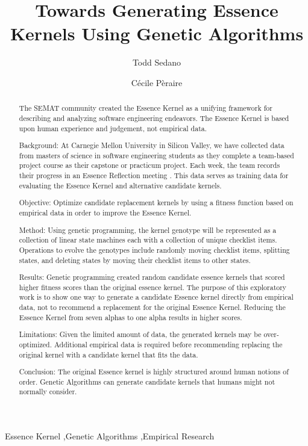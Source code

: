 \documentclass[preprint,12pt,3p]{elsarticle}
\begin{document}
\begin{frontmatter}

\title{Towards Generating Essence Kernels Using Genetic Algorithms}

\author{Todd Sedano}
\author{C\'ecile P\`eraire}
\address{Carnegie Mellon University}
\address{Silicon Valley Campus}
\address{Moffett Field, CA 94035, USA}



\begin{abstract}
The SEMAT community created the Essence Kernel as a unifying framework for describing and analyzing software engineering endeavors. \cite{JacobsonQueue} The Essence Kernel is based upon human experience and judgement, not empirical data. 

Background: At Carnegie Mellon University in Silicon Valley, we have collected data from masters of science in software engineering students as they complete a team-based project course as their capstone or practicum project. Each week, the team records their progress in an Essence Reflection meeting \cite{EASE2014}. This data serves as training data for evaluating the Essence Kernel and alternative candidate kernels.

Objective: Optimize candidate replacement kernels by using a fitness function based on empirical data in order to improve the Essence Kernel.

Method: Using genetic programming, the kernel genotype will be represented as a collection of linear state machines each with a collection of unique checklist items. Operations to evolve the genotypes include randomly moving checklist items, splitting states, and deleting states by moving their checklist items to other states. 

Results: Genetic programming created random candidate essence kernels that scored higher fitness scores than the original essence kernel. The purpose of this exploratory work is to show one way to generate a candidate Essence kernel directly from empirical data, not to recommend a replacement for the original Essence Kernel. Reducing the Essence Kernel from seven alphas to one alpha results in higher scores.

Limitations: Given the limited amount of data, the generated kernels may be over-optimized. Additional empirical data is required before recommending replacing the original kernel with a candidate kernel that fits the data.

Conclusion: The original Essence kernel is highly structured around human notions of order. Genetic Algorithms can generate candidate kernels that humans might not normally consider.
\end{abstract}

\begin{keyword}
Essence Kernel \sep Genetic Algorithms \sep Empirical Research
\end{keyword}

\end{frontmatter}
\end{document}
